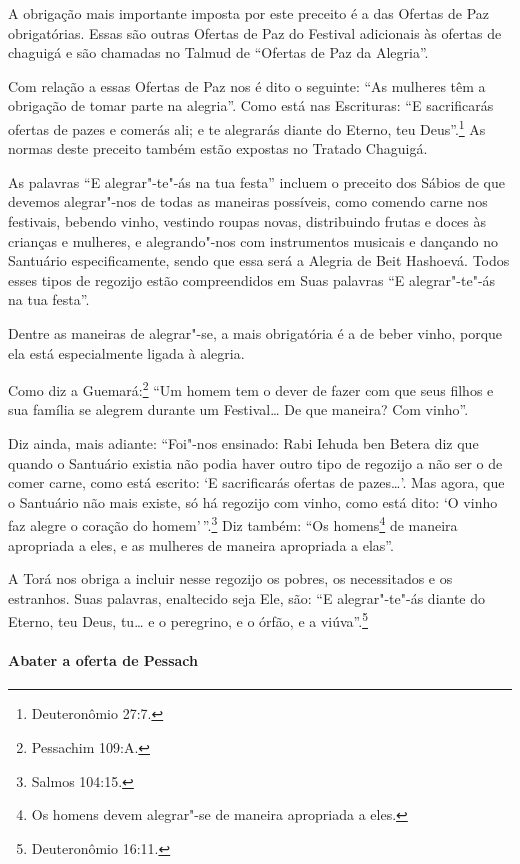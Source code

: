 \begin{multicols}{2}
A obrigação mais importante imposta por este preceito é a das Ofertas
de Paz obrigatórias. Essas são outras Ofertas de Paz do Festival
adicionais às ofertas de chaguigá\starr{} e são chamadas no Talmud\starr{} de ``Ofertas
de Paz da Alegria''.

Com relação a essas Ofertas de Paz nos é dito o seguinte: ``As mulheres
têm a obrigação de tomar parte na alegria''. Como está nas Escrituras:
``E sacrificarás ofertas de pazes e comerás ali; e te alegrarás diante
do Eterno, teu Deus''.\footnote{Deuteronômio 27:7.} As normas deste preceito
também estão expostas no Tratado Chaguigá\starr.

As palavras ``E alegrar"-te"-ás na tua festa'' incluem o preceito dos
Sábios de que devemos alegrar"-nos de todas as maneiras possíveis, como
comendo carne nos festivais, bebendo vinho, vestindo roupas novas,
distribuindo frutas e doces às crianças e mulheres, e alegrando"-nos com
instrumentos musicais e dançando no Santuário especificamente, sendo que
essa será a Alegria de Beit Hashoevá\starr. Todos esses tipos de regozijo
estão compreendidos em Suas palavras ``E alegrar"-te"-ás na tua festa''.

Dentre as maneiras de alegrar"-se, a mais obrigatória é a de beber vinho, porque ela está especialmente ligada à alegria.

Como diz a Guemará\starr:\footnote{Pessachim\starr{} 109:A.} ``Um homem tem o dever de fazer
com que seus filhos e sua família se alegrem durante um Festival\ldots{} De que
maneira? Com vinho''.

Diz ainda, mais adiante: ``Foi"-nos ensinado: Rabi Iehuda ben Betera\starr{} diz
que quando o Santuário existia não podia haver outro tipo de regozijo a
não ser o de comer carne, como está escrito: `E sacrificarás ofertas de
pazes\ldots{}'. Mas agora, que o Santuário não mais existe, só há regozijo com
vinho, como está dito: `O vinho faz alegre o coração do homem'\,''.\footnote{Salmos 104:15.} Diz também:
``Os homens\footnote{Os homens devem alegrar"-se de maneira apropriada a eles.} de maneira apropriada a eles, e as
mulheres de maneira apropriada a elas''.

A Torá\starr{} nos obriga a incluir nesse regozijo os pobres, os necessitados
e os estranhos. Suas palavras, enaltecido seja Ele, são: ``E
alegrar"-te"-ás diante do Eterno, teu Deus, tu\ldots{} e o peregrino, e o
órfão, e a viúva''.\footnote{Deuteronômio 16:11.}

\paragraph{Abater a oferta de Pessach\starr{}}


\end{multicols}
